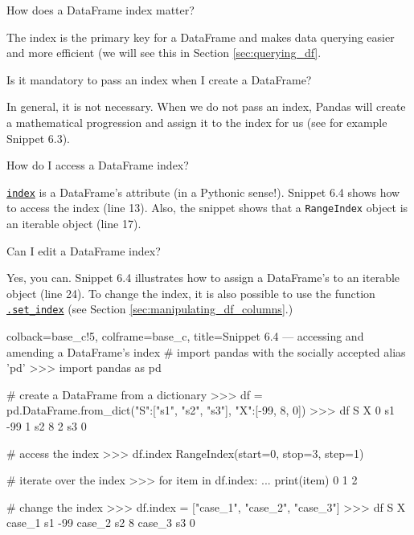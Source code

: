 \documentclass[a4paper,11pt]{book}
\numberwithin{figure}{chapter}
\numberwithin{table}{chapter}
\newcommand{\question}[1]{%
    \begin{tcolorbox}[colback=comp_c!10,colframe=comp_c,sidebyside align=top,width=\linewidth,before skip=1ex]
        #1
    \end{tcolorbox}
    \switchcolumn%
}
\newcommand{\note}[1]{%
    \begin{tcolorbox}[colback=white!0,colframe=white!10,width=\linewidth,before skip=1ex]
        #1
    \end{tcolorbox}
}
\begin{document}
\begin{paracol}{2}
	\question{\raggedright How does a DataFrame index matter?}
	\note{The index is the primary key for a DataFrame and makes data querying easier and more efficient (we will see this in Section \ref{sec:querying_df}.}
\end{paracol}

\begin{paracol}{2}
	\question{\raggedright Is it mandatory to pass an index when I create a DataFrame?}
	\note{In general, it is not necessary. When we do not pass an index, Pandas will create a mathematical progression and assign it to the index for us (see for example Snippet 6.3).}
\end{paracol}

\begin{paracol}{2}
	\question{\raggedright How do I access a DataFrame index?}
	\note{\href{https://pandas.pydata.org/docs/reference/api/pandas.DataFrame.index.html}{\texttt{index}} is a DataFrame's attribute (in a Pythonic sense!). Snippet 6.4 shows how to access the index (line 13). Also, the snippet shows that a \texttt{RangeIndex} object is an iterable object (line 17).}
\end{paracol}

\begin{paracol}{2}
	\question{\raggedright Can I edit a DataFrame index?}
	\note{Yes, you can. Snippet 6.4 illustrates how to assign a DataFrame's to an iterable object (line 24). To change the index, it is also possible to use the function \href{https://pandas.pydata.org/docs/reference/api/pandas.DataFrame.set_index.html}{\texttt{.set\_index}} (see Section \ref{sec:manipulating_df_columns}.)}
\end{paracol}

\begin{pythoncode}[linenos=True]{colback=base_c!5, colframe=base_c, title=\sffamily Snippet 6.4 --- accessing and amending a DataFrame's index}
# import pandas with the socially accepted alias 'pd'
>>> import pandas as pd

# create a DataFrame from a dictionary
>>> df = pd.DataFrame.from_dict({"S":["s1", "s2", "s3"], "X":[-99, 8, 0]})
>>> df
    S   X
0  s1 -99
1  s2   8
2  s3   0

# access the index 
>>> df.index
RangeIndex(start=0, stop=3, step=1)

# iterate over the index
>>> for item in df.index:
...     print(item)
0
1
2

# change the index
>>> df.index = ["case_1", "case_2", "case_3"]
>>> df
         S   X
case_1  s1 -99
case_2  s2   8
case_3  s3   0

\end{pythoncode}
\end{document}
